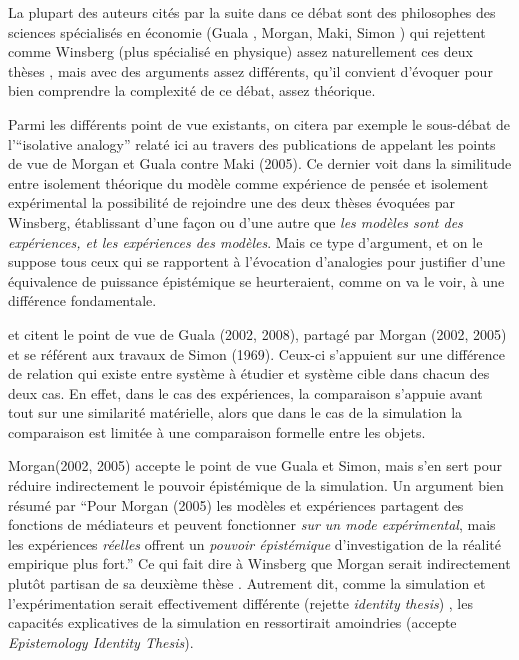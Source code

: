 La plupart des auteurs cités par la suite dans ce débat sont des philosophes des sciences spécialisés en économie (Guala , Morgan, Maki, Simon ) qui rejettent comme Winsberg (plus spécialisé en physique) assez naturellement ces deux thèses \autocite{Winsberg2009}, mais avec des arguments assez différents, qu'il convient d'évoquer pour bien comprendre la complexité de ce débat, assez théorique.

Parmi les différents point de vue existants, on citera par exemple le sous-débat de l'\foreignquote{english}{isolative analogy} relaté ici au travers des publications de \textcite{Phan2008, Phan2010} appelant les points de vue de Morgan et Guala contre Maki (2005). Ce dernier voit dans la similitude entre isolement théorique du modèle comme expérience de pensée et isolement expérimental  la possibilité de rejoindre une des deux thèses évoquées par Winsberg, établissant d'une façon ou d'une autre que \textit{les modèles sont des expériences, et les expériences des modèles}. Mais ce type d'argument, et on le suppose tous ceux qui se rapportent à l'évocation d'analogies pour justifier d'une équivalence de puissance épistémique se heurteraient, comme on va le voir, à une différence fondamentale.

\textcite{Phan2010} et \textcite{Winsberg2013} citent le point de vue de Guala (2002, 2008), partagé par Morgan (2002, 2005) et se référent aux travaux de Simon (1969). Ceux-ci s'appuient sur une différence de relation qui existe entre système à étudier et système cible dans chacun des deux cas. En effet, dans le cas des expériences, la comparaison s'appuie avant tout sur une similarité matérielle, alors que dans le cas de la simulation la comparaison est limitée à une comparaison formelle entre les objets.

Morgan(2002, 2005) accepte le point de vue Guala et Simon, mais s'en sert pour réduire indirectement le pouvoir épistémique de la simulation. Un argument bien résumé par \textcite{Phan2008} \enquote{Pour Morgan (2005) les modèles et expériences partagent des fonctions de médiateurs et peuvent fonctionner \textit{sur un mode expérimental}, mais les expériences \textit{réelles} offrent un \textit{pouvoir épistémique} d'investigation de la réalité empirique plus fort.}  Ce qui fait dire à Winsberg que Morgan serait indirectement plutôt partisan de sa deuxième thèse . Autrement dit, comme la simulation et l'expérimentation serait effectivement différente (rejette \textit{identity thesis}) , les capacités explicatives de la simulation en ressortirait amoindries (accepte \textit{Epistemology Identity Thesis}).

